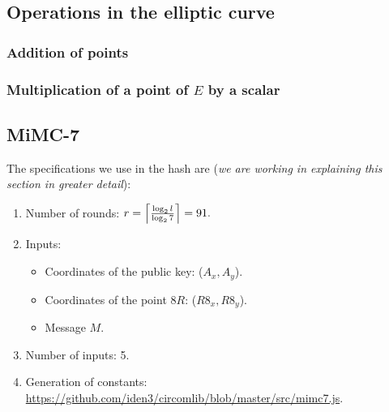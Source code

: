 \documentclass{article}
\begin{document}
\begin{spacing}{1.2}
	\subsection{Operations in the elliptic curve}
		\subsubsection{Addition of points} 
		\subsubsection{Multiplication of a point of $E$ by a scalar} 
			\subsection{MiMC-7}
		\label{sec-mimc}
				
				
		The specifications we use in the hash are ({\it we are working in explaining this section in greater detail}):

		\begin{enumerate}
		\item Number of rounds: $ r = \ceil*{\frac{\llog l}{\llog 7}} = 91. $
		
		\item Inputs: \begin{itemize}
					\item Coordinates of the public key: ($A_x, A_y$).
					\item Coordinates of the point $8R$: ($R8_x, R8_y$).
					\item Message $M$. 
				\end{itemize}
		\item Number of inputs: 5.

		\item Generation of constants:  \url{https://github.com/iden3/circomlib/blob/master/src/mimc7.js}.
		\end{enumerate}
		

\end{spacing}
\end{document}
